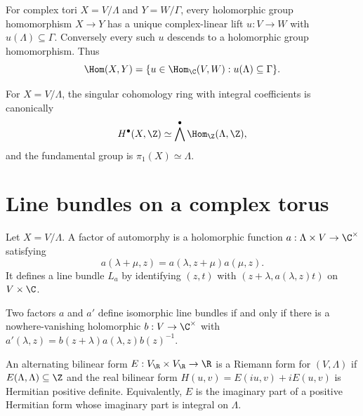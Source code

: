 \begin{proposition}
\label{mumford-prop-torus-homomorphisms}
For complex tori $X=V/\Lambda$ and $Y=W/\Gamma$, every holomorphic group
homomorphism $X\to Y$ has a unique complex-linear lift $u:V\to W$ with
$u(\Lambda)\subseteq\Gamma$.  Conversely every such $u$ descends to a
holomorphic group homomorphism.  Thus
\[
  \Hom(X,Y)=\{u\in\Hom_\C(V,W):u(\Lambda)\subseteq\Gamma\}.
\]
\notready
\end{proposition}

\begin{corollary}
\label{mumford-cor-torus-cohomology}
For $X=V/\Lambda$, the singular cohomology ring with integral coefficients is
canonically
\[
 H^\bullet(X,\Z)\simeq \bigwedge^\bullet\Hom_\Z(\Lambda,\Z),
\]
and the fundamental group is $\pi_1(X)\simeq\Lambda$.
\notready
\end{corollary}

\section{Line bundles on a complex torus}
\label{mumford-I2}

\begin{definition}
\label{mumford-def-factor-automorphy}
Let $X=V/\Lambda$.  A factor of automorphy is a holomorphic function
$a:\Lambda\times V\to\C^\times$ satisfying
\[
 a(\lambda+\mu,z)=a(\lambda,z+\mu)a(\mu,z).
\]
It defines a line bundle $L_a$ by identifying $(z,t)$ with
$(z+\lambda,a(\lambda,z)t)$ on $V\times\C$.
\notready
\end{definition}

\begin{lemma}
\label{mumford-lem-factor-gauge}
Two factors $a$ and $a'$ define isomorphic line bundles if and only if there
is a nowhere-vanishing holomorphic $b:V\to\C^\times$ with
$a'(\lambda,z)=b(z+\lambda)a(\lambda,z)b(z)^{-1}$.
\notready
\end{lemma}

\begin{definition}
\label{mumford-def-riemann-form-analytic}
An alternating bilinear form $E:V_\R\times V_\R\to\R$ is a Riemann form for
$(V,\Lambda)$ if $E(\Lambda,\Lambda)\subseteq\Z$ and the real bilinear form
$H(u,v)=E(iu,v)+iE(u,v)$ is Hermitian positive definite.  Equivalently, $E$
is the imaginary part of a positive Hermitian form whose imaginary part is
integral on $\Lambda$.
\notready
\end{definition}

